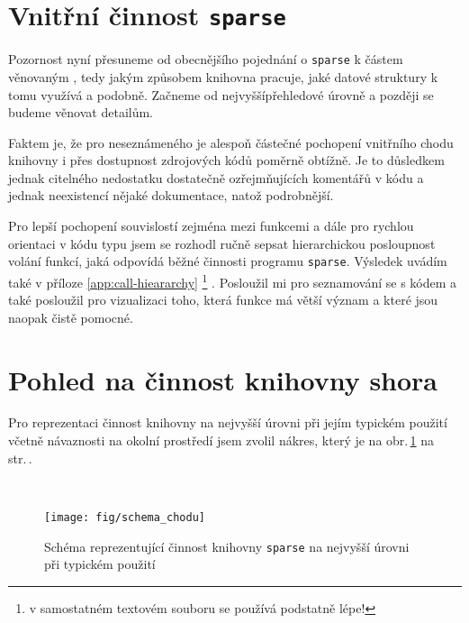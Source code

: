 \section{Vnitřní činnost \texttt{sparse}}

Pozornost nyní přesuneme od obecnějšího pojednání o \texttt{sparse}
k částem věnovaným , tedy jakým způsobem knihovna pracuje,
jaké datové struktury k tomu využívá a podobně. Začneme od nejvyšší\ndash{}přehledové
úrovně a později se budeme věnovat detailům.

Faktem je, že pro neseznámeného je alespoň částečné pochopení vnitřního
chodu knihovny i přes dostupnost zdrojových kódů poměrně obtížně.
Je to důsledkem jednak citelného nedostatku dostatečně
ozřejmňujících komentářů v kódu a jednak neexistencí nějaké
dokumentace, natož podrobnější.

Pro lepší pochopení souvislostí
zejména mezi funkcemi a dále pro rychlou orientaci v kódu typu
 jsem se rozhodl ručně sepsat hierarchickou posloupnost
volání funkcí, jaká odpovídá běžné činnosti programu \texttt{sparse}.
Výsledek uvádím také v příloze \ref{app:call-hieararchy}%
%
\footnote{v samostatném textovém souboru se používá podstatně lépe!}%
%
.
Posloužil mi pro seznamování se s kódem a také posloužil
pro vizualizaci toho, která funkce má větší význam a které jsou
naopak čistě pomocné.

\section{Pohled na činnost knihovny shora}

Pro reprezentaci činnost knihovny na nejvyšší úrovni
při jejím typickém použití včetně návaznosti na okolní
prostředí jsem zvolil nákres, který je na obr.\,\ref{fig:chod} na str.\,\pageref{fig:chod}.

\hspace*{\fill}\\[-\baselineskip]
\begin{figure}[!h]
    \begin{center}
        \texttt{[image: fig/schema\_chodu]}
        \label{fig:chod}
        \caption{Schéma reprezentující činnost knihovny \texttt{sparse} na nejvyšší úrovni
                 při typickém použití}
    \end{center}
\end{figure}

